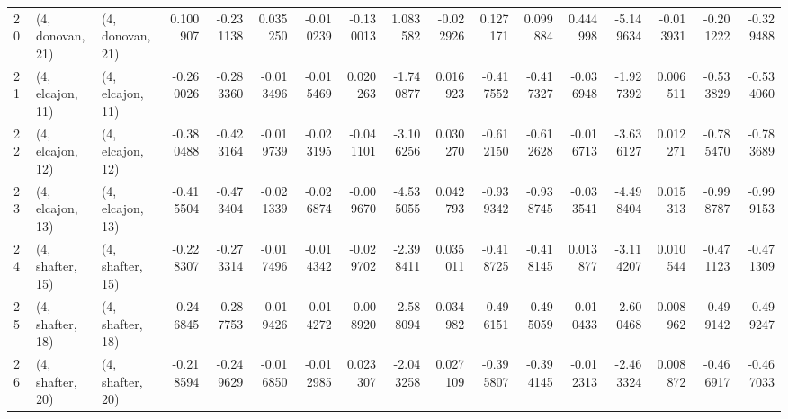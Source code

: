 \begin{tabular}{lllrrrrrrrrrrrrrr}
20 &  (4, donovan, 21) &  (4, donovan, 21) &  0.100907 & -0.231138 &   0.035250 & -0.010239 & -0.130013 &   1.083582 & -0.022926 &   0.127171 &  0.099884 &  0.444998 &  -5.149634 & -0.013931 & -0.201222 & -0.329488 \\
21 &  (4, elcajon, 11) &  (4, elcajon, 11) & -0.260026 & -0.283360 &  -0.013496 & -0.015469 &  0.020263 &  -1.740877 &  0.016923 &  -0.417552 & -0.417327 & -0.036948 &  -1.927392 &  0.006511 & -0.533829 & -0.534060 \\
22 &  (4, elcajon, 12) &  (4, elcajon, 12) & -0.380488 & -0.423164 &  -0.019739 & -0.023195 & -0.041101 &  -3.106256 &  0.030270 &  -0.612150 & -0.612628 & -0.016713 &  -3.636127 &  0.012271 & -0.785470 & -0.783689 \\
23 &  (4, elcajon, 13) &  (4, elcajon, 13) & -0.415504 & -0.473404 &  -0.021339 & -0.026874 & -0.009670 &  -4.535055 &  0.042793 &  -0.939342 & -0.938745 & -0.033541 &  -4.498404 &  0.015313 & -0.998787 & -0.999153 \\
24 &  (4, shafter, 15) &  (4, shafter, 15) & -0.228307 & -0.273314 &  -0.017496 & -0.014342 & -0.029702 &  -2.398411 &  0.035011 &  -0.418725 & -0.418145 &  0.013877 &  -3.114207 &  0.010544 & -0.471123 & -0.471309 \\
25 &  (4, shafter, 18) &  (4, shafter, 18) & -0.246845 & -0.287753 &  -0.019426 & -0.014272 & -0.008920 &  -2.588094 &  0.034982 &  -0.496151 & -0.495059 & -0.010433 &  -2.600468 &  0.008962 & -0.499142 & -0.499247 \\
26 &  (4, shafter, 20) &  (4, shafter, 20) & -0.218594 & -0.249629 &  -0.016850 & -0.012985 &  0.023307 &  -2.043258 &  0.027109 &  -0.395807 & -0.394145 & -0.012313 &  -2.463324 &  0.008872 & -0.466917 & -0.467033 \\
\bottomrule
\end{tabular}
